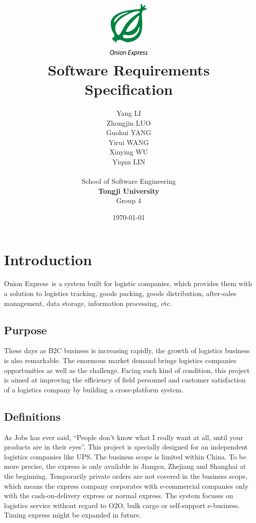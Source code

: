 \documentclass[12pt]{scrreprt}
\title{
\includegraphics[width=0.8in]{DocumentRes/OnionExpress.png} \\
\vspace*{1in}
\textbf{Software Requirements Specification}}
\author{Yang LI\\
        Zhongjin LUO\\
        Guohui YANG\\
        Yirui WANG\\
        Xinying WU\\
        Yiqun LIN\\
		    \vspace*{0.5in} \\
		    School of Software Engineering\\
        \textbf{Tongji University}\\
        Group 4\\
}
\date{\today}
\begin{document}
\maketitle
\tableofcontents

\chapter{Introduction}
Onion Express\textregistered\ is a system built for logistic companies,
which provides them with a solution to logistics tracking, goods packing,
goods distribution, after-sales management, data storage, information
processing, etc.

\section{Purpose}
These days as B2C business is increasing rapidly, the growth of
logistics business is also remarkable. The enormous market demand
brings logistics companies opportunities as well as the challenge.
Facing such kind of condition, this project is aimed at improving the
efficiency of field personnel and customer satisfaction of a logistics
company by building a cross-platform system.

\section{Definitions}
As Jobs has ever said, “People don't know what I really want at all,
until your products are in their eyes”. This project is specially
designed for an independent logistics companies like UPS. The business
scope is limited within China. To be more precise, the express is only
available in Jiangsu, Zhejiang and Shanghai at the beginning.
Temporarily private orders are not covered in the business scope,
which means the express company corporates with e-commercial companies only
with the cash-on-delivery express or normal express. The system focuses on logistics
service without regard to O2O, bulk cargo or self-support e-business.
Timing express might be expanded in future.
\end{document}
